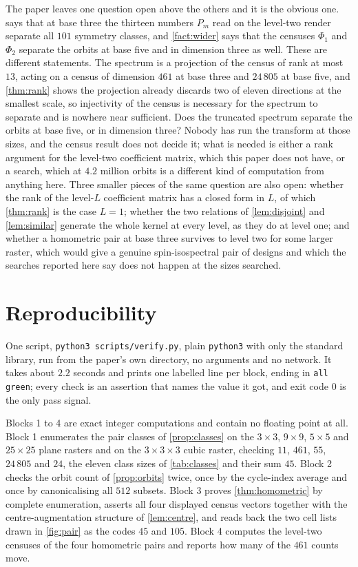 \documentclass[11pt]{amsart}
\theoremstyle{definition}
\theoremstyle{remark}
\begin{document}
The paper leaves one question open above the others and it is the obvious one.  says that at base three the thirteen numbers $P_m$ read on the level-two render separate all $101$ symmetry classes, and \cref{fact:wider} says that the censuses $\Phi_1$ and $\Phi_2$ separate the orbits at base five and in dimension three as well. These are different statements. The spectrum is a projection of the census of rank at most $13$, acting on a census of dimension $461$ at base three and $24\,805$ at base five, and \cref{thm:rank} shows the projection already discards two of eleven directions at the smallest scale, so injectivity of the census is necessary for the spectrum to separate and is nowhere near sufficient. Does the truncated spectrum separate the orbits at base five, or in dimension three? Nobody has run the transform at those sizes, and the census result does not decide it; what is needed is either a rank argument for the level-two coefficient matrix, which this paper does not have, or a search, which at $4.2$ million orbits is a different kind of computation from anything here. Three smaller pieces of the same question are also open: whether the rank of the level-$L$ coefficient matrix has a closed form in $L$, of which \cref{thm:rank} is the case $L = 1$; whether the two relations of \cref{lem:disjoint} and \cref{lem:similar} generate the whole kernel at every level, as they do at level one; and whether a homometric pair at base three survives to level two for some larger raster, which would give a genuine spin-isospectral pair of designs and which the searches reported here say does not happen at the sizes searched.

\section{Reproducibility}
\label{sec:repro}

One script, \texttt{python3 scripts/verify.py}, plain \texttt{python3} with only the standard library, run from the paper's own directory, no arguments and no network. It takes about $2.2$ seconds and prints one labelled line per block, ending in \texttt{all green}; every check is an assertion that names the value it got, and exit code $0$ is the only pass signal.

Blocks 1 to 4 are exact integer computations and contain no floating point at all. Block 1 enumerates the pair classes of \cref{prop:classes} on the $3\times3$, $9\times9$, $5\times5$ and $25\times25$ plane rasters and on the $3\times3\times3$ cubic raster, checking $11$, $461$, $55$, $24\,805$ and $24$, the eleven class sizes of \cref{tab:classes} and their sum $45$. Block 2 checks the orbit count of \cref{prop:orbits} twice, once by the cycle-index average and once by canonicalising all $512$ subsets. Block 3 proves \cref{thm:homometric} by complete enumeration, asserts all four displayed census vectors together with the centre-augmentation structure of \cref{lem:centre}, and reads back the two cell lists drawn in \cref{fig:pair} as the codes $45$ and $105$. Block 4 computes the level-two censuses of the four homometric pairs and reports how many of the $461$ counts move.
\end{document}
